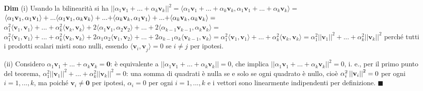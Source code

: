 \documentclass{article}
\begin{document}
\textbf{Dim} (i) Usando la bilinearit\`{a} si ha $\left\vert \left\vert
\alpha _{1}\mathbf{v}_{1}+...+\alpha _{k}\mathbf{v}_{k}\right\vert
\right\vert ^{2}=\langle \alpha _{1}\mathbf{v}_{1}+...+\alpha _{k}\mathbf{v}%
_{k},\alpha _{1}\mathbf{v}_{1}+...+\alpha _{k}\mathbf{v}_{k}\mathbf{\rangle =%
}$ $\langle \alpha _{1}\mathbf{v}_{1},\alpha _{1}\mathbf{v}_{1}\mathbf{%
\rangle +...}\langle \alpha _{1}\mathbf{v}_{1},\alpha _{k}\mathbf{v}_{k}%
\mathbf{\rangle +...+}\langle \alpha _{k}\mathbf{v}_{k},\alpha _{1}\mathbf{v}%
_{1}\mathbf{\rangle +...+}\langle \alpha _{k}\mathbf{v}_{k},\alpha _{k}%
\mathbf{v}_{k}\mathbf{\rangle =}$ $\alpha _{1}^{2}\langle \mathbf{v}_{1},%
\mathbf{v}_{1}\mathbf{\rangle }+...+\alpha _{k}^{2}\langle \mathbf{v}_{k},%
\mathbf{v}_{k}\mathbf{\rangle +}2\langle \alpha _{1}\mathbf{v}_{1},\alpha
_{2}\mathbf{v}_{2}\mathbf{\rangle +...+}2\langle \alpha _{k-1}\mathbf{v}%
_{k-1},\alpha _{k}\mathbf{v}_{k}\mathbf{\rangle =}$ $\alpha _{1}^{2}\langle 
\mathbf{v}_{1},\mathbf{v}_{1}\mathbf{\rangle }+...+\alpha _{k}^{2}\langle 
\mathbf{v}_{k},\mathbf{v}_{k}\mathbf{\rangle +}2\alpha _{1}\alpha
_{2}\langle \mathbf{v}_{1},\mathbf{v}_{2}\mathbf{\rangle +...+}2\alpha
_{k-1}\alpha _{k}\langle \mathbf{v}_{k-1},\mathbf{v}_{k}\mathbf{\rangle =}%
\alpha _{1}^{2}\langle \mathbf{v}_{1},\mathbf{v}_{1}\mathbf{\rangle }%
+...+\alpha _{k}^{2}\langle \mathbf{v}_{k},\mathbf{v}_{k}\mathbf{\rangle =}%
\alpha _{1}^{2}\left\vert \left\vert \mathbf{v}_{1}\right\vert \right\vert
^{2}+...+\alpha _{k}^{2}\left\vert \left\vert \mathbf{v}_{k}\right\vert
\right\vert ^{2}$ perch\'{e} tutti i prodotti scalari misti sono nulli,
essendo $\langle \mathbf{v}_{i}\mathbf{,v}_{j}\mathbf{\rangle }=0$ se $i\neq
j$ per ipotesi.

(ii) Considero $\alpha _{1}\mathbf{v}_{1}+...+\alpha _{k}\mathbf{v}_{k}=%
\mathbf{0}$: \`{e} equivalente a $\left\vert \left\vert \alpha _{1}\mathbf{v}%
_{1}+...+\alpha _{k}\mathbf{v}_{k}\right\vert \right\vert =0$, che implica $%
\left\vert \left\vert \alpha _{1}\mathbf{v}_{1}+...+\alpha _{k}\mathbf{v}%
_{k}\right\vert \right\vert ^{2}=0$, i. e., per il primo punto del teorema, $%
\alpha _{1}^{2}\left\vert \left\vert \mathbf{v}_{1}\right\vert \right\vert
^{2}+...+\alpha _{k}^{2}\left\vert \left\vert \mathbf{v}_{k}\right\vert
\right\vert ^{2}=0$: una somma di quadrati \`{e} nulla se e solo se ogni
quadrato \`{e} nullo, cio\`{e} $\alpha _{i}^{2}\left\vert \left\vert \mathbf{%
v}_{i}\right\vert \right\vert ^{2}=0$ per ogni $i=1,...,k$, ma poich\'{e} $%
\mathbf{v}_{i}\mathbf{\neq 0}$ per ipotesi, $\alpha _{i}=0$ per ogni $%
i=1,...,k$ e i vettori sono linearmente indipendenti per definizione. $%
\blacksquare $
\end{document}
